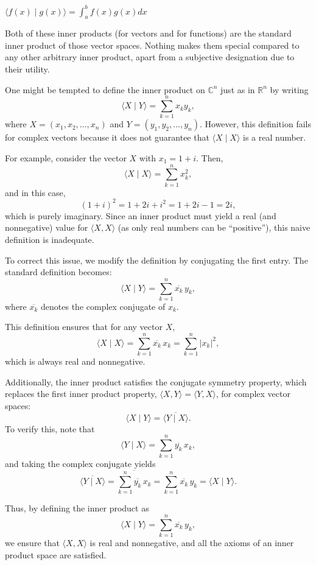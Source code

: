 \documentclass{report}
\begin{document}
$
\langle f(x) \mid g(x)\rangle=\displaystyle\int_{a}^{b} f(x) g(x) d x
$

Both of these inner products (for vectors and for functions) are the standard inner product of those vector spaces. Nothing makes them special compared to any other arbitrary inner product, apart from a subjective designation due to their utility.

One might be tempted to define the inner product on \(\mathbb{C}^n\) just as in \(\mathbb{R}^n\) by writing
\[
\langle X \mid Y \rangle = \sum_{k=1}^{n} x_k y_k,
\]
where \(X = (x_1, x_2, \dots, x_n)\) and \(Y = (y_1, y_2, \dots, y_n)\). However, this definition fails for complex vectors because it does not guarantee that \(\langle X \mid X \rangle\) is a real number.

For example, consider the vector \(X\) with \(x_1 = 1+i\). Then,
\[
\langle X \mid X \rangle = \sum_{k=1}^{n} x_k^2,
\]
and in this case,
\[
(1+i)^2 = 1 + 2i + i^2 = 1 + 2i - 1 = 2i,
\]
which is purely imaginary. Since an inner product must yield a real (and nonnegative) value for \(\langle X, X \rangle\) (as only real numbers can be ``positive''), this naive definition is inadequate.

To correct this issue, we modify the definition by conjugating the first entry. The standard definition becomes:
\[
\langle X \mid Y \rangle = \sum_{k=1}^{n} \overline{x_k}\, y_k,
\]
where \(\overline{x_k}\) denotes the complex conjugate of \(x_k\).

This definition ensures that for any vector \(X\),
\[
\langle X \mid X \rangle = \sum_{k=1}^{n} \overline{x_k}\, x_k = \sum_{k=1}^{n} \lvert x_k \rvert^2,
\]
which is always real and nonnegative.

Additionally, the inner product satisfies the conjugate symmetry property, which replaces the first inner product property, $\langle X, Y \rangle = \langle Y, X \rangle$, for complex vector spaces:
\[
\langle X \mid Y \rangle = \overline{\langle Y \mid X \rangle}.
\]
To verify this, note that
\[
\langle Y \mid X \rangle = \sum_{k=1}^{n} \overline{y_k}\, x_k,
\]
and taking the complex conjugate yields
\[
\overline{\langle Y\mid X \rangle} = \overline{\sum_{k=1}^{n} \overline{y_k}\, x_k} = \sum_{k=1}^{n} \overline{x_k}\, y_k = \langle X \mid Y \rangle.
\]

Thus, by defining the inner product as
\[
\langle X \mid Y \rangle = \sum_{k=1}^{n} \overline{x_k}\, y_k,
\]
we ensure that \(\langle X, X \rangle\) is real and nonnegative, and all the axioms of an inner product space are satisfied.
\end{document}
